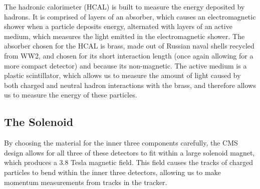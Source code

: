 The hadronic calorimeter (HCAL) is built to measure the energy deposited by hadrons. It is comprised of layers of an absorber, which causes an electromagnetic shower when a particle deposits energy, alternated with layers of an active medium, which measures the light emitted in the electromagnetic shower. The absorber chosen for the HCAL is brass, made out of Russian naval shells recycled from WW2, and chosen for its short interaction length (once again allowing for a more compact detector) and because its non-magnetic. The active medium is a plastic scintillator, which allows us to measure the amount of light caused by both charged and neutral hadron interactions with the brass, and therefore allows us to measure the energy of these particles. 


\vspace{5mm}
\subsection{The Solenoid}

By choosing the material for the inner three components carefully, the CMS design allows for all three of these detectors to fit within a large solenoid magnet, which produces a 3.8 Tesla magnetic field. This field causes the tracks of charged particles to bend within the inner three detectors, allowing us to make momentum measurements from tracks in the tracker.
\vspace{5mm}

